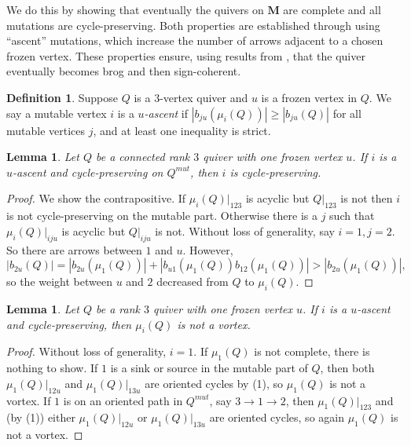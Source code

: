 \documentclass[12pt]{amsart}
\newtheorem{lem}[thm]{Lemma}
\theoremstyle{definition}
\newtheorem{defn}[thm]{Definition}
\theoremstyle{remark}
\numberwithin{equation}{section}
\begin{document}
We do this by showing that eventually the quivers on $\mathbf M$ are complete and all mutations are cycle-preserving.  Both properties are established through using ``ascent'' mutations, which increase the number of arrows adjacent to a chosen frozen vertex.  These properties ensure, using results from , that the quiver eventually becomes brog and then sign-coherent.  

\begin{defn}
Suppose $Q$ is a $3$-vertex quiver and $u$ is a frozen vertex in $Q$.
We say a mutable vertex $i$ is a \emph{$u$-ascent} if $|b_{ju}(\mu_i(Q))| \geq |b_{ju}(Q)|$ for all mutable vertices $j$, and at least one inequality is strict.
\end{defn}

\begin{lem}
\label{lem: ascents are cycle preserving}
Let $Q$ be a connected rank $3$ quiver with one frozen vertex $u$. 
If $i$ is a $u$-ascent and cycle-preserving on $Q^{mut}$, then $i$ is cycle-preserving.
\end{lem}
\begin{proof}
We show the contrapositive. 
If $\mu_i(Q)|_{123}$ is acyclic but $Q|_{123}$ is not then $i$ is not cycle-preserving on the mutable part. 
Otherwise there is a $j$ such that $\mu_i(Q)|_{iju}$ is acyclic but $Q|_{iju}$ is not. 
Without loss of generality, say $i=1,j=2$.
So there are arrows between $1$ and $u$.
However, 
$$|b_{2u}(Q)| = |b_{2u}(\mu_1(Q))| + |b_{u1}(\mu_1(Q))b_{12}(\mu_1(Q))| > |b_{2u}(\mu_1(Q))|,$$
so the weight between $u$ and $2$ decreased from $Q$ to $\mu_i(Q)$.
\end{proof}

\begin{lem}
\label{lem: cycle preserving ascents avoid vortices}
Let $Q$ be a rank $3$ quiver with one frozen vertex $u$. 
If $i$ is a $u$-ascent and cycle-preserving, then $\mu_i(Q)$ is not a vortex.
\end{lem}

\begin{proof}
Without loss of generality, $i=1$. 
If $\mu_1(Q)$ is not complete, there is nothing to show.
If $1$ is a sink or source in the mutable part of $Q$, then both $\mu_1(Q)|_{12u}$ and $\mu_1(Q)|_{13u}$ are oriented cycles by  (1), so $\mu_1(Q)$ is not a vortex.
If $1$ is on an oriented path in $Q^{mut}$, say $3 \rightarrow 1 \rightarrow 2$, then $\mu_1(Q)|_{123}$ and (by  (1)) either $\mu_1(Q)|_{12u}$ or $\mu_1(Q)|_{13u}$ are oriented cycles, so again $\mu_1(Q)$ is not a vortex.
\end{proof}
\end{document}
